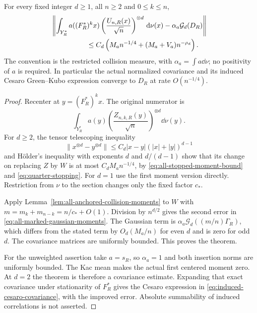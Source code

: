 \begin{theorem}
\label{thm:all-marked-gaussian-moments}
For every fixed integer $d\ge1$, all $n\ge2$ and $0\le k\le n$,
\begin{align}
 &\left\|\int_{Y_R^*}a((F_R^*)^kx)
        \left(\frac{U_{n,R}(x)}{\sqrt n}\right)^{\otimes d}\dd\nu(x)
                   -\alpha_a\mathcal G_d(D_R)\right\|\notag\\
 &\hspace{18mm}\le C_d\left(M_an^{-1/4}
                           +(M_a+V_a)n^{-\rho_d}\right).
 \label{eq:all-marked-gaussian-moments}
\end{align}
The convention is the restricted collision measure, with
$\alpha_a=\int a\dd\nu$; no positivity of $a$ is required.
In particular the actual normalized covariance and its induced
Cesaro Green--Kubo expression converge to $D_R$ at rate $O(n^{-1/4})$.
\end{theorem}
\begin{proof}
Recenter at $y=(F_R^*)^kx$. The original numerator is
\[
 \int_{Y_R^*}a(y)
       \left(\frac{Z_{n,k,R}(y)}{\sqrt n}\right)^{\otimes d}\dd\nu(y).
\]
For $d\ge2$, the tensor telescoping inequality
\[
 \|x^{\otimes d}-y^{\otimes d}\|
       \le C_d|x-y|(|x|+|y|)^{d-1}
\]
and H\"older's inequality with exponents $d$ and $d/(d-1)$ show
that its change on replacing $Z$ by $W$ is at most $C_dM_an^{-1/4}$,
by \eqref{eq:all-stopped-moment-bound} and \eqref{eq:quarter-stopping}.
For $d=1$ use the first moment version directly. Restriction from
$\nu$ to the section changes only the fixed factor $c_*$.

Apply Lemma~\ref{lem:all-anchored-collision-moments} to $W$ with
$m=m_k+m_{n-k}=n/c_*+O(1)$. Division by $n^{d/2}$ gives the second
error in \eqref{eq:all-marked-gaussian-moments}. The Gaussian term
is $\alpha_a\mathcal G_d((m/n)\Gamma_R)$, which differs from the
stated term by $O_d(M_a/n)$ for even $d$ and is zero for odd $d$.
The covariance matrices are uniformly bounded. This proves the theorem.

For the unweighted assertion take $a=s_R$, so $\alpha_a=1$ and both
insertion norms are uniformly bounded. The Kac mean makes the actual
first centered moment zero. At $d=2$ the theorem is therefore a
covariance estimate. Expanding that exact covariance under stationarity
of $F_R^*$ gives the Cesaro expression in
\eqref{eq:induced-cesaro-covariance}, with the improved error.
Absolute summability of induced correlations is not asserted.
\end{proof}

